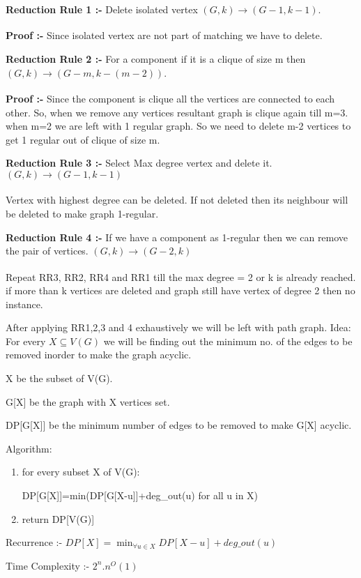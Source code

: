 \documentclass{homeworg}
\begin{document}
 
\exercise

\textbf{Reduction Rule 1 :-} Delete isolated vertex $(G,k) \xrightarrow[]{} (G-1,k-1)$.

\textbf{Proof :-} Since isolated vertex are not part of matching we have to delete.

\textbf{Reduction Rule 2 :-} For a component if it is a clique of size m then $(G,k) \xrightarrow[] {}(G-m, k-(m-2))$.

\textbf{Proof :-} Since the component is clique all the vertices are connected to each other. So, when we remove any vertices resultant graph is clique again till m=3. when m=2 we are left with 1 regular graph. So we need to delete m-2 vertices to get 1 regular out of clique of size m. 

\textbf{Reduction Rule 3 :-} Select Max degree vertex and delete it. $(G,k) \xrightarrow[]{} (G-1,k-1)$ 


Vertex with highest degree can be deleted. If not deleted then its neighbour will be deleted to make graph 1-regular.


\textbf{Reduction Rule 4 :-} If we have a component as 1-regular then we can remove the pair of vertices. $(G,k) \xrightarrow[]{} (G-2,k)$ 
 

Repeat RR3, RR2, RR4 and RR1 till the max degree = 2 or k is already reached. if more than k vertices are deleted and graph still have vertex of degree 2 then no instance. 

After applying RR1,2,3 and 4 exhaustively we will be left with path graph.  
\exercise
Idea: For every $X \subseteq V(G)$ we will be finding out the minimum no. of the edges to be removed inorder to make the graph acyclic. 

X be the subset of V(G).

G[X] be the graph with X vertices set.

DP[G[X]] be the minimum number of edges to be removed to make G[X] acyclic.

Algorithm:
\begin{enumerate}

\item for every subset X of V(G):

\quad DP[G[X]]=min(DP[G[X-u]]+deg\_out(u) for all u in X)


\item return DP[V(G)]

\end{enumerate}


Recurrence :- \quad $DP[X]=\min_{\forall u \in X} DP[X-u]+deg\_out(u)$

Time Complexity :- $2^n .n^O(1)$ 
\end{document}
